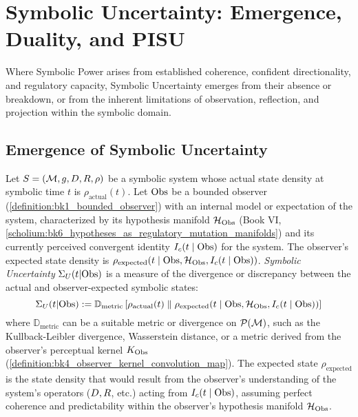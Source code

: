 \section{Symbolic Uncertainty: Emergence, Duality, and PISU}
\label{sec:bk7_symbolic_uncertainty_emergence_duality_pisu}
Where Symbolic Power arises from established coherence, confident directionality, and regulatory capacity, Symbolic Uncertainty emerges from their absence or breakdown, or from the inherent limitations of observation, reflection, and projection within the symbolic domain.

\subsection{Emergence of Symbolic Uncertainty}
\label{subsec:bk7_emergence_symbolic_uncertainty}

\begin{definition}
\label{definition:bk7_symbolic_uncertainty}
Let \(S = (\mathcal{M}, g, D, R, \rho)\) be a symbolic system whose actual state density at symbolic time \(t\) is \(\rho_{\text{actual}}(t)\). Let \(\mathrm{Obs}\) be a bounded observer (\ref{definition:bk1_bounded_observer}) with an internal model or expectation of the system, characterized by its hypothesis manifold \(\mathcal{H}_{\mathrm{Obs}}\) (Book VI, \ref{scholium:bk6_hypotheses_as_regulatory_mutation_manifolds}) and its currently perceived convergent identity \(I_c(t \mid \mathrm{Obs})\) for the system. The observer's expected state density is \(\rho_{\text{expected}}(t \mid \mathrm{Obs}, \mathcal{H}_{\mathrm{Obs}}, I_c(t \mid \mathrm{Obs}))\).
\emph{Symbolic Uncertainty} \(\Sigma_U(t|\mathrm{Obs})\) is a measure of the divergence or discrepancy between the actual and observer-expected symbolic states:
\[
\Sigma_U(t|\mathrm{Obs}) := \mathbb{D}_{\text{metric}}\left[\rho_{\text{actual}}(t) \parallel \rho_{\text{expected}}(t \mid \mathrm{Obs}, \mathcal{H}_{\mathrm{Obs}}, I_c(t \mid \mathrm{Obs}))\right]
\]
where \(\mathbb{D}_{\text{metric}}\) can be a suitable metric or divergence on \(\mathcal{P}(\mathcal{M})\), such as the Kullback-Leibler divergence, Wasserstein distance, or a metric derived from the observer's perceptual kernel \(K_{\mathrm{Obs}}\) (\ref{definition:bk4_observer_kernel_convolution_map}).
The expected state \(\rho_{\text{expected}}\) is the state density that would result from the observer's understanding of the system's operators (\(D, R\), etc.) acting from \(I_c(t \mid \mathrm{Obs})\), assuming perfect coherence and predictability within the observer's hypothesis manifold \(\mathcal{H}_{\mathrm{Obs}}\).
\end{definition}

